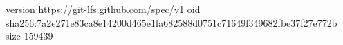 version https://git-lfs.github.com/spec/v1
oid sha256:7a2e271e83ca8e14200d465e1fa682588d0751c71649f349682fbe37f27e772b
size 159439
